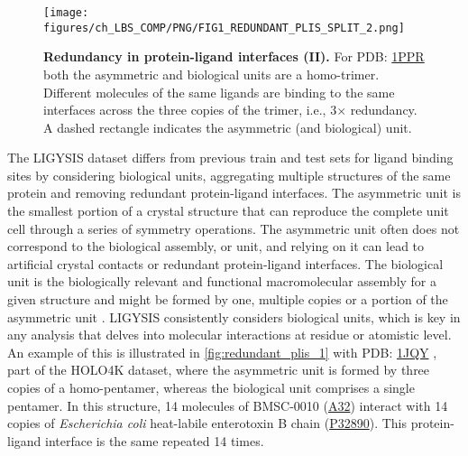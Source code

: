 \begin{figure}[htb!]
    \centering
    \texttt{[image: figures/ch\_LBS\_COMP/PNG/FIG1\_REDUNDANT\_PLIS\_SPLIT\_2.png]}
    \caption[Redundancy in protein-ligand interfaces (II)]{\textbf{Redundancy in protein-ligand interfaces (II).} For PDB: \href{https://www.ebi.ac.uk/pdbe/entry/pdb/1PPR}{1PPR} both the asymmetric and biological units are a homo-trimer. Different molecules of the same ligands are binding to the same interfaces across the three copies of the trimer, i.e., 3$\times$ redundancy. A dashed rectangle indicates the asymmetric (and biological) unit.}
    \label{fig:redundant_plis_2}
\end{figure}

The LIGYSIS dataset differs from previous train and test sets for ligand binding sites by considering biological units, aggregating multiple structures of the same protein and removing redundant protein-ligand interfaces. The asymmetric unit is the smallest portion of a crystal structure that can reproduce the complete unit cell through a series of symmetry operations. The asymmetric unit often does not correspond to the biological assembly, or unit, and relying on it can lead to artificial crystal contacts or redundant protein-ligand interfaces. The biological unit is the biologically relevant and functional macromolecular assembly for a given structure and might be formed by one, multiple copies or a portion of the asymmetric unit \cite{XU_2019_ASSEMBLIES}. LIGYSIS consistently considers biological units, which is key in any analysis that delves into molecular interactions at residue or atomistic level. An example of this is illustrated in \autoref{fig:redundant_plis_1} with PDB: \href{https://www.ebi.ac.uk/pdbe/entry/pdb/1jqy}{1JQY} \cite{PICKENS_2002_ANCHOR}, part of the HOLO4K dataset, where the asymmetric unit is formed by three copies of a homo-pentamer, whereas the biological unit comprises a single pentamer. In this structure, 14 molecules of BMSC-0010 (\href{https://www.rcsb.org/ligand/A32}{A32}) interact with 14 copies of \textit{Escherichia coli} heat-labile enterotoxin B chain (\href{https://www.uniprot.org/uniprotkb/P32890/entry}{P32890}). This protein-ligand interface is the same repeated 14 times.

\newpage

